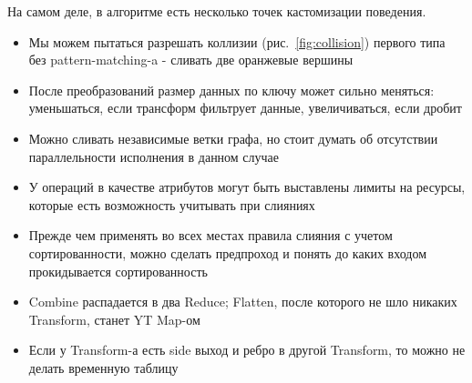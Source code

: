 На самом деле, в алгоритме есть несколько точек кастомизации поведения.\\
\begin{itemize}
\item Мы можем пытаться разрешать коллизии (рис.~\ref{fig:collision}) первого типа без pattern-matching-a - сливать две оранжевые вершины
\item После преобразований размер данных по ключу может сильно меняться: уменьшаться, если трансформ фильтрует данные, увеличиваться, если дробит
\item Можно сливать независимые ветки графа, но стоит думать об отсутствии параллельности исполнения в данном случае
\item У операций в качестве атрибутов могут быть выставлены лимиты на ресурсы, которые есть возможность учитывать при слияниях
\item Прежде чем применять во всех местах правила слияния с учетом сортированности, можно сделать предпроход и понять до каких входом прокидывается сортированность
\item Combine распадается в два Reduce; Flatten, после которого не шло никаких Transform, станет YT Map-ом
\item Если у Transform-а есть side выход и ребро в другой Transform, то можно не делать временную таблицу
\end{itemize}

